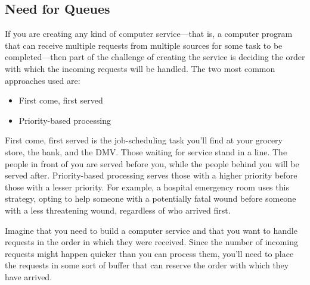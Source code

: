 \documentclass[12pt,a4paper,final,twoside,titlepage]{book}
\begin{document}
\subsection{Need for Queues}
If you are creating any kind of computer service—that is, a computer program that can receive multiple requests from multiple sources for some task to be completed—then part of the challenge of creating the service is deciding the order with which the incoming requests will be handled. The two most common approaches used are:
\begin{itemize}
\item First come, first served
\item Priority-based processing
\end{itemize}
First come, first served is the job-scheduling task you'll find at your grocery store, the bank, and the DMV. Those waiting for service stand in a line. The people in front of you are served before you, while the people behind you will be served after. Priority-based processing serves those with a higher priority before those with a lesser priority. For example, a hospital emergency room uses this strategy, opting to help someone with a potentially fatal wound before someone with a less threatening wound, regardless of who arrived first.

Imagine that you need to build a computer service and that you want to handle requests in the order in which they were received. Since the number of incoming requests might happen quicker than you can process them, you'll need to place the requests in some sort of buffer that can reserve the order with which they have arrived.
\end{document}
